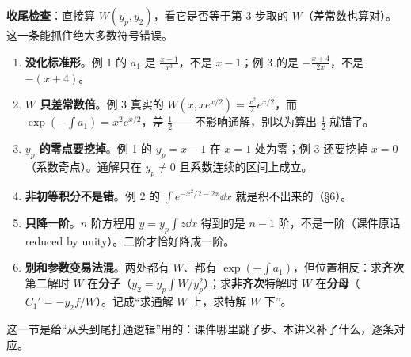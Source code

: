 \documentclass[11pt]{ctexart}
\begin{document}
\textbf{收尾检查}：直接算 $W(y_p,y_2)$，看它是否等于第 3 步取的 $W$（差常数也算对）。这一条能抓住绝大多数符号错误。

\begin{enumerate}
\item \textbf{没化标准形}。例 1 的 $a_1$ 是 $\frac{x-1}{x^3}$，不是 $x-1$；例 3 的是 $-\frac{x+4}{2x}$，不是 $-(x+4)$。
\item \textbf{$W$ 只差常数倍}。例 3 真实的 $W(x,xe^{x/2})=\frac{x^2}{2}e^{x/2}$，而 $\exp\left(-\int a_1\right)=x^2e^{x/2}$，差 $\frac12$——不影响通解，别以为算出 $\frac12$ 就错了。
\item \textbf{$y_p$ 的零点要挖掉}。例 1 的 $y_p=x-1$ 在 $x=1$ 处为零；例 3 还要挖掉 $x=0$（系数奇点）。通解只在 $y_p\neq0$ 且系数连续的区间上成立。
\item \textbf{非初等积分不是错}。例 2 的 $\int e^{-x^2/2-2x}\dd x$ 就是积不出来的（\S6）。
\item \textbf{只降一阶}。$n$ 阶方程用 $y=y_p\int z\dd x$ 得到的是 $n-1$ 阶，不是一阶（课件原话 reduced by unity）。二阶才恰好降成一阶。
\item \textbf{别和参数变易法混}。两处都有 $W$、都有 $\exp\left(-\int a_1\right)$，但位置相反：求\textbf{齐次}第二解时 $W$ 在\textbf{分子}（$y_2=y_p\int W/y_p^2$）；求\textbf{非齐次}特解时 $W$ 在\textbf{分母}（$C_1'=-y_2f/W$）。记成“求通解 $W$ 上，求特解 $W$ 下”。
\end{enumerate}

\flowerrule

这一节是给“从头到尾打通逻辑”用的：课件哪里跳了步、本讲义补了什么，逐条对应。





\end{document}
